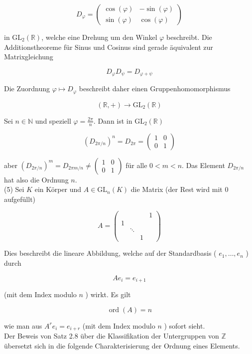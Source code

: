 \documentclass[10pt, letterpaper]{article}
\begin{document}
$$
D_{\varphi}=\left(\begin{array}{rr}
\cos (\varphi) & -\sin (\varphi) \\
\sin (\varphi) & \cos (\varphi)
\end{array}\right)
$$

in $\mathrm{GL}_{2}(\mathbb{R})$, welche eine Drehung um den Winkel $\varphi$ beschreibt. Die Additionstheoreme für Sinus und Cosinus sind gerade äquivalent zur Matrixgleichung

$$
D_{\varphi} D_{\psi}=D_{\varphi+\psi}
$$

Die Zuordnung $\varphi \mapsto D_{\varphi}$ beschreibt daher einen Gruppenhomomorphismus

$$
(\mathbb{R},+) \rightarrow \mathrm{GL}_{2}(\mathbb{R})
$$

Sei $n \in \mathbb{N}$ und speziell $\varphi=\frac{2 \pi}{n}$. Dann ist in $\mathrm{GL}_{2}(\mathbb{R})$

$$
\left(D_{2 \pi / n}\right)^{n}=D_{2 \pi}=\left(\begin{array}{ll}
1 & 0 \\
0 & 1
\end{array}\right)
$$

aber $\left(D_{2 \pi / n}\right)^{m}=D_{2 \pi m / n} \neq\left(\begin{array}{ll}1 & 0 \\ 0 & 1\end{array}\right)$ für alle $0<m<n$. Das Element $D_{2 \pi / n}$ hat also die Ordnung $n$.\\
(5) Sei $K$ ein Körper und $A \in \mathrm{GL}_{n}(K)$ die Matrix (der Rest wird mit 0 aufgefüllt)

$$
A=\left(\begin{array}{llll} 
& & & 1 \\
1 & & & \\
& \ddots & & \\
& & 1 &
\end{array}\right)
$$

Dies beschreibt die lineare Abbildung, welche auf der Standardbasis ( $e_{1}, \ldots, e_{n}$ ) durch

$$
A e_{i}=e_{i+1}
$$

(mit dem Index modulo $n$ ) wirkt. Es gilt

$$
\operatorname{ord}(A)=n
$$

wie man aus $A^{r} e_{i}=e_{i+r}$ (mit dem Index modulo $n$ ) sofort sieht.\\
Der Beweis von Satz 2.8 über die Klassifikation der Untergruppen von $\mathbb{Z}$ übersetzt sich in die folgende Charakterisierung der Ordnung eines Elements.
\end{document}
